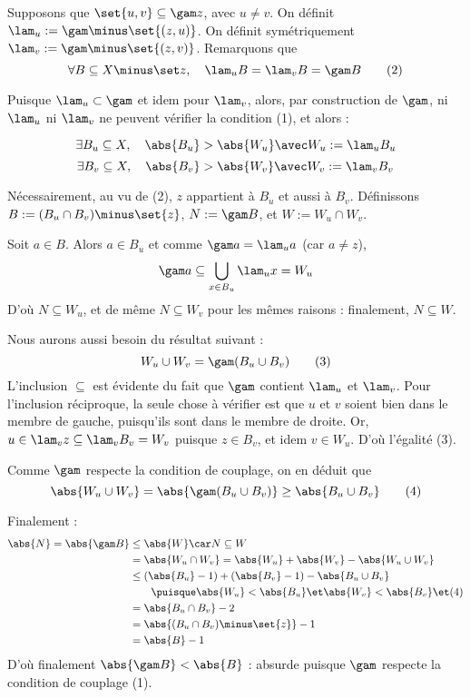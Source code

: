     Supposons que $\set{u,v} \subseteq \gam z$, avec $u \neq v$. On définit $\lam_u := \gam \minus \set{(z,u)}$. On définit symétriquement $\lam_v := \gam \minus \set{(z,v)}$. Remarquons que
    \[ \forall B \subseteq X \minus \set z, \quad \lam_u B = \lam_v B = \gam B \tag{2} \]
    
    Puisque $\lam_u \subset \gam$ et idem pour $\lam_v$, alors, par construction de $\gam$, ni $\lam_u$ ni $\lam_v$ ne peuvent vérifier la condition (1), et alors :
    
    \[ \exists B_u \subseteq X, \quad \abs{B_u} > \abs{W_u} \avec W_u := \lam_u B_u \]
    \[ \exists B_v \subseteq X, \quad \abs{B_v} > \abs{W_v} \avec W_v := \lam_v B_v \]
    
    Nécessairement, au vu de (2), $z$ appartient à $B_u$ et aussi à $B_v$. Définissons $B := (B_u \cap B_v) \minus \set{z}$, $N := \gam B$, et $W := W_u \cap W_v$.
    
    Soit $a \in B$. Alors $a \in B_u$ et comme $\gam a = \lam_u a$ (car $a \neq z$),
    \[ \gam a \subseteq  \bigcup_{x \in B_u} \lam_u x = W_u \]
    D'où $N \subseteq W_u$, et de même $N \subseteq W_v$ pour les mêmes raisons : finalement, $N \subseteq W$.
    
    Nous aurons aussi besoin du résultat suivant :
    \[ W_u \cup W_v = \gam (B_u \cup B_v) \tag{3} \]
    L'inclusion $\subseteq$ est évidente du fait que $\gam$ contient $\lam_u$ et $\lam_v$. Pour l'inclusion réciproque, la seule chose à vérifier est que $u$ et $v$ soient bien dans le membre de gauche, puisqu'ils sont dans le membre de droite. Or, $u \in \lam_v z \subseteq \lam_v B_v = W_v$ puisque $z \in B_v$, et idem $v \in W_u$. D'où l'égalité (3).
    
    Comme $\gam$ respecte la condition de couplage, on en déduit que
    \[ \abs{W_u \cup W_v} = \abs{\gam (B_u \cup B_v) } \geq \abs{B_u \cup B_v} \tag{4} \]
    
    Finalement :
    \[ \begin{aligned}
        \abs{N} = \abs{\gam B} &\leq \abs{W}  \car N \subseteq W \\
        & = \abs{ W_u \cap W_v } = \abs {W_u} + \abs{W_v} - \abs{W_u \cup W_v}\\
        & \leq (\abs {B_u} - 1)  + (\abs{B_v} - 1) - \abs{B_u \cup B_v} \\
        &    \qquad  \puisque \abs{W_u} < \abs{B_u} \et \abs{W_v} < \abs{B_v} \et \text{(4)} \\
        & =    \abs {B_u \cap B_v} - 2 \\
        & =    \abs {(B_u \cap B_v) \minus \set{z}} - 1 \\
        & =    \abs{B} - 1
    \end{aligned} \]
    D'où finalement $\abs{\gam B} < \abs{B}$ : absurde puisque $\gam$ respecte la condition de couplage (1).
    
